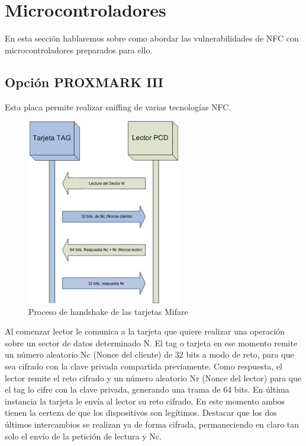 \section{Microcontroladores}
En esta sección hablaremos sobre como abordar las vulnerabilidades de NFC con microcontroladores preparados para ello.

\subsection{Opción PROXMARK III}
Esta placa permite realizar sniffing de varias tecnologías NFC.
\begin{figure}[!h]
	\centering
	\includegraphics[width=0.6\textwidth]{figures/protocolo.jpg}
	\caption{Proceso de handshake de las tarjetas Mifare}
\end{figure}


Al comenzar lector le comunica a la tarjeta que quiere realizar una operación sobre un sector de datos determinado N. El tag o tarjeta en ese momento remite un número aleatorio Nc (Nonce del cliente) de 32 bits a modo de reto, para que sea cifrado con la clave privada compartida previamente. Como respuesta, el lector remite el reto cifrado y un número aleatorio Nr (Nonce del lector) para que el tag lo cifre con la clave privada, generando una trama de 64 bits. En última instancia la tarjeta le envía al lector su reto cifrado. En este momento ambos tienen la certeza de que los dispositivos son legítimos. Destacar que los dos últimos intercambios se realizan ya de forma cifrada, permaneciendo en claro tan solo el envío de la petición de lectura y Nc.\\

